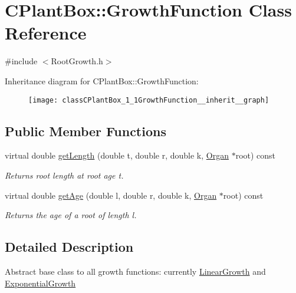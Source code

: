 \hypertarget{classCPlantBox_1_1GrowthFunction}{}\section{C\+Plant\+Box\+:\+:Growth\+Function Class Reference}
\label{classCPlantBox_1_1GrowthFunction}


{\ttfamily \#include $<$Root\+Growth.\+h$>$}



Inheritance diagram for C\+Plant\+Box\+:\+:Growth\+Function\+:\nopagebreak
\begin{figure}[H]
\begin{center}
\leavevmode
\texttt{[image: classCPlantBox\_1\_1GrowthFunction\_\_inherit\_\_graph]}
\end{center}
\end{figure}
\subsection*{Public Member Functions}
\begin{DoxyCompactItemize}
\item 
virtual double \hyperlink{classCPlantBox_1_1GrowthFunction_a41b83da5d75beab49846c5b92a421e43}{get\+Length} (double t, double r, double k, \hyperlink{classCPlantBox_1_1Organ}{Organ} $\ast$root) const
\begin{DoxyCompactList}\small\item\em Returns root length at root age t. \end{DoxyCompactList}\item 
virtual double \hyperlink{classCPlantBox_1_1GrowthFunction_a006b428760c410389afa54853fe7cc1f}{get\+Age} (double l, double r, double k, \hyperlink{classCPlantBox_1_1Organ}{Organ} $\ast$root) const
\begin{DoxyCompactList}\small\item\em Returns the age of a root of length l. \end{DoxyCompactList}\end{DoxyCompactItemize}


\subsection{Detailed Description}
Abstract base class to all growth functions\+: currently \hyperlink{classCPlantBox_1_1LinearGrowth}{Linear\+Growth} and \hyperlink{classCPlantBox_1_1ExponentialGrowth}{Exponential\+Growth}

